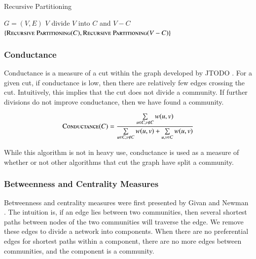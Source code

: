 \documentclass[phd,tocprelim]{cornell}
\renewcommand{\caption}[1]{\singlespacing\hangcaption{#1}\normalspacing}
\begin{document}
\begin{algorithm}                              %
\caption{{\sc Recursive Partitioning}}         %
\label{alg_top_down}                                   %
\begin{algorithmic}                        %
\REQUIRE $G=(V, E)$
\RETURN $V$
\ELSE
\STATE divide $V$ into $C$ and $V - C$
\RETURN $\{\mbox{\sc Recursive Partitioning}(C),\mbox{\sc Recursive Partitioning}(V-C)\}$
\ENDIF
\end{algorithmic}
\label{alg_rec_part}
\end{algorithm}

\subsubsection{Conductance}

Conductance is a measure of a cut within the graph developed by JTODO \cite{JTODO}.  For a given cut, if conductance is low, then there are relatively few edges crossing the cut.  Intuitively, this implies that the cut does not divide a community.  If further divisions do not improve conductance, then we have found a community.

\begin{equation}
\mbox{\sc Conductance}(C) = \frac{\sum\limits_{u \in C, v \notin C} w(u,v)}{\sum\limits_{u \in C, v \notin C} w(u,v)  + \sum\limits_{u,v \in C} w(u, v)}
\end{equation}

While this algorithm is not in heavy use, conductance is used as a measure of whether or not other algorithms that cut the graph have split a community.

\subsubsection{Betweenness and Centrality Measures}

Betweenness and centrality measures were first presented by Givan and Newman \cite{girvan}.  The intuition is, if an edge lies between two communities, then several shortest paths between nodes of the two communities will traverse the edge.  We remove these edges to divide a network into components.  When there are no preferential edges for shortest paths within a component, there are no more edges between communities, and the component is a community.
\end{document}
